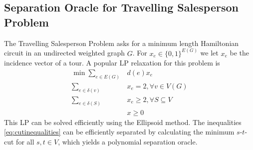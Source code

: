 \documentclass[10pt]{article}
\begin{document}
\subsection{Separation Oracle for Travelling Salesperson Problem}\label{subsec:seporacle}
The Travelling Salesperson Problem asks for a minimum length Hamiltonian circuit in an undirected weighted graph $G$. For $x_e \in \{0,1\}^{E(G)}$ we let $x_e$ be the incidence vector of a tour. A popular LP relaxation for this problem is
\begin{align}
\min \sum_{e \in E(G)} &d(e) x_e\nonumber \\
\sum_{e \in \delta (v)}& x_e =2 , \forall v \in V(G) \label{eq:cutinequalities}\\
\sum_{e \in \delta(S)} &x_e \ge 2 , \forall S \subseteq V\nonumber\\
 &x \ge 0\nonumber
\end{align}
This LP can be solved efficiently using the Ellipsoid method. The inequalities \autoref{eq:cutinequalities} can be efficiently separated by calculating the minimum $s$-$t$-cut for all $s,t \in V$, which yields a polynomial separation oracle.


\printbibliography
\end{document}
